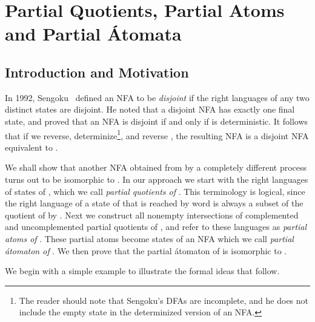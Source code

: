\documentclass[preprint,12pt]{elsarticle}
\begin{document}
\section{Partial Quotients, Partial Atoms and Partial \'Atomata}
\label{sec:partial}
\subsection{Introduction and Motivation}
In 1992, Sengoku~\cite{Sen92} defined an NFA to be \emph{disjoint} if the right languages of any two distinct states are disjoint. He noted that a disjoint NFA  has exactly one final state, and proved that an NFA is disjoint if and only if  is deterministic. It follows that if we reverse, determinize\footnote{The reader should note that Sengoku's DFAs are incomplete, and he does not include the empty
state in the  determinized version of an NFA.}, and reverse , the resulting NFA  is a disjoint NFA equivalent to . 

We shall show that another NFA obtained from  by a completely different process turns out to be isomorphic to . In our approach we start with the right languages of states of , which we call \emph{partial quotients of }. This terminology is logical, since the right language of a state of  that is reached by word  is always a subset of the quotient of  by . Next we construct all nonempty intersections of complemented and uncomplemented partial quotients of , and refer to these languages as 
\emph{partial atoms of }. These partial atoms become states of an NFA which we call 
\emph{partial \'atomaton of }. We then prove that the partial \'atomaton of  is isomorphic to .

We begin with a simple example to illustrate the formal ideas that follow.
\end{document}
